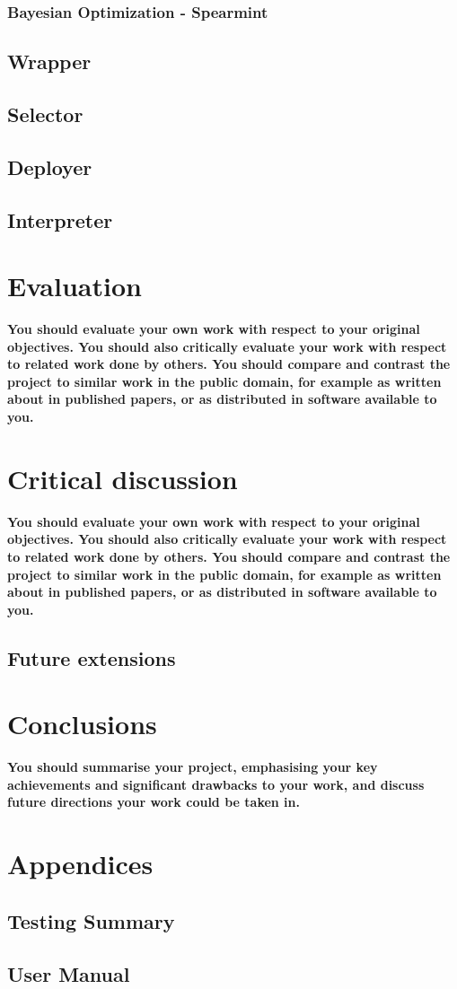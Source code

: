 \documentclass{article}
\begin{document}
\subsubsection{Bayesian Optimization - Spearmint}
\subsection{Wrapper}
\subsection{Selector}
\subsection{Deployer}
\subsection{Interpreter}
\section{Evaluation}
\textbf{You should evaluate your own work with respect to your original objectives. You should also critically evaluate your work with respect to related work done by others. You should compare and contrast the project to similar work in the public domain, for example as written about in published papers, or as distributed in software available to you.}

\section{Critical discussion}
\textbf{You should evaluate your own work with respect to your
original objectives. You should also critically evaluate
your work with respect to related work done by others.
You should compare and contrast the project to similar
work in the public domain, for example as written about
in published papers, or as distributed in software available to you. }
\subsection{Future extensions}
\section{Conclusions}
\textbf{You should summarise your project, emphasising your
key achievements and significant drawbacks to your
work, and discuss future directions your work could be
taken in.}
\newpage


\newpage
\section*{Appendices}
\subsection*{Testing Summary}
\subsection*{User Manual}
\end{document}
